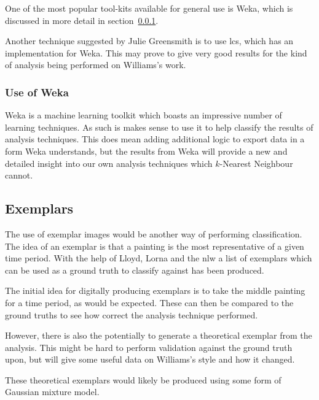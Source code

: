 One of the most popular tool-kits available for general use is Weka\cite{Hall2009WEKA}, which is discussed in more
detail in section~\ref{sec:bg-weka}.

Another technique suggested by Julie Greensmith is to use \gls{lcs}\cite{Bacardit2013Largescale}, 
which has an implementation for Weka. This may prove to give very good results for the kind of
analysis being performed on Williams's work.

\subsubsection{Use of Weka}\label{sec:bg-weka}
Weka is a machine learning toolkit which boasts an impressive number of learning techniques. As
such is makes sense to use it to help classify the results of analysis techniques. This does mean
adding additional logic to export data in a form Weka understands, but the results from Weka
will provide a new and detailed insight into our own analysis techniques which $k$-Nearest 
Neighbour cannot.


\subsection{Exemplars}
The use of exemplar images would be another way of performing classification. The idea of an 
exemplar is that a painting is the most representative of a given time period. With the help of
Lloyd, Lorna and the \gls{nlw} a list of exemplars which can be used as a ground truth to classify
against has been produced.

The initial idea for digitally producing exemplars is to take the middle painting for a time 
period, as would be expected. These can then be compared to the ground truths to see how correct
the analysis technique performed.

However, there is also the potentially to generate a theoretical exemplar from the analysis. This
might be hard to perform validation against the ground truth upon, but will give some useful data
on Williams's style and how it changed.

These theoretical exemplars would likely be produced using some form of Gaussian mixture model.
